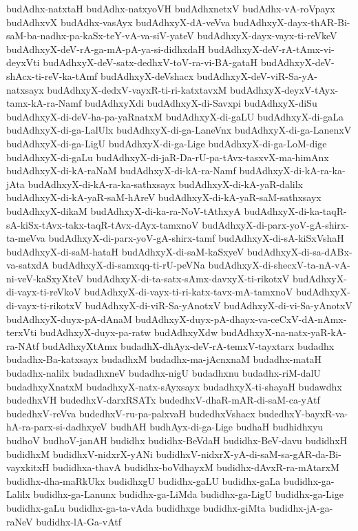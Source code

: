 {budAdhx-natxtaH
budAdhx-natxyoVH
budAdhxnetxV
budAdhx-vA-roVpayx
budAdhxvX
budAdhx-vasAyx
budAdhxyX-dA-veVva
budAdhxyX-dayx-thAR-Bi-saM-ba-nadhx-pa-kaSx-teY-vA-va-siV-yateV
budAdhxyX-dayx-vayx-ti-reVkeV
budAdhxyX-deV-rA-ga-mA-pA-ya-si-didhxdaH
budAdhxyX-deV-rA-tAmx-vi-deyxVti
budAdhxyX-deV-satx-dedhxV-toV-ra-vi-BA-gataH
budAdhxyX-deV-shAcx-ti-reV-ka-tAmf
budAdhxyX-deVshacx
budAdhxyX-deV-viR-Sa-yA-natxsayx
budAdhxyX-dedxV-vayxR-ti-ri-katxtavxM
budAdhxyX-deyxV-tAyx-tamx-kA-ra-Namf
budAdhxyXdi
budAdhxyX-di-Savxpi
budAdhxyX-diSu
budAdhxyX-di-deV-ha-pa-yaRnatxM
budAdhxyX-di-gaLU
budAdhxyX-di-gaLa
budAdhxyX-di-ga-LalUlx
budAdhxyX-di-ga-LaneVnx
budAdhxyX-di-ga-LanenxV
budAdhxyX-di-ga-LigU
budAdhxyX-di-ga-Lige
budAdhxyX-di-ga-LoM-dige
budAdhxyX-di-gaLu
budAdhxyX-di-jaR-Da-rU-pa-tAvx-tasxvX-ma-himAnx
budAdhxyX-di-kA-raNaM
budAdhxyX-di-kA-ra-Namf
budAdhxyX-di-kA-ra-ka-jAta
budAdhxyX-di-kA-ra-ka-sathxsayx
budAdhxyX-di-kA-yaR-dalilx
budAdhxyX-di-kA-yaR-saM-hAreV
budAdhxyX-di-kA-yaR-saM-sathxsayx
budAdhxyX-dikaM
budAdhxyX-di-ka-ra-NoV-tAthxyA
budAdhxyX-di-ka-taqR-sA-kiSx-tAvx-takx-taqR-tAvx-dAyx-tamxnoV
budAdhxyX-di-parx-yoV-gA-shirx-ta-meVva
budAdhxyX-di-parx-yoV-gA-shirx-tamf
budAdhxyX-di-sA-kiSxVshaH
budAdhxyX-di-saM-hataH
budAdhxyX-di-saM-kaSxyeV
budAdhxyX-di-sa-dABx-va-satxdA
budAdhxyX-di-samxqq-ti-rU-peVNa
budAdhxyX-di-shecxV-ta-nA-vA-ni-veV-kaSxyXteV
budAdhxyX-di-ta-satx-sAmx-davxyX-ti-rikotxV
budAdhxyX-di-vayx-ti-reVkoV
budAdhxyX-di-vayx-ti-ri-katx-tavx-mA-tamxnoV
budAdhxyX-di-vayx-ti-rikotxV
budAdhxyX-di-viR-Sa-yAnotxV
budAdhxyX-di-vi-Sa-yAnotxV
budAdhxyX-duyx-pA-dAnaM
budAdhxyX-duyx-pA-dhayx-va-ceCxV-dA-nAmx-terxVti
budAdhxyX-duyx-pa-ratw
budAdhxyXdw
budAdhxyX-na-natx-yaR-kA-ra-NAtf
budAdhxyXtAmx
budadhX-dhAyx-deV-rA-temxV-tayxtarx
budadhx
budadhx-Ba-katxsayx
budadhxM
budadhx-ma-jAcnxnaM
budadhx-mataH
budadhx-nalilx
budadhxneV
budadhx-nigU
budadhxnu
budadhx-riM-dalU
budadhxyXnatxM
budadhxyX-natx-sAyxsayx
budadhxyX-ti-shayaH
budawdhx
budedhxVH
budedhxV-darxRSATx
budedhxV-dhaR-mAR-di-saM-ca-yAtf
budedhxV-reVva
budedhxV-ru-pa-palxvaH
budedhxVshacx
budedhxY-bayxR-va-hA-ra-parx-si-dadhxyeV
budhAH
budhAyx-di-ga-Lige
budhaH
budhidhxyu
budhoV
budhoV-janAH
budidhx
budidhx-BeVdaH
budidhx-BeV-davu
budidhxH
budidhxM
budidhxV-nidxrX-yANi
budidhxV-nidxrX-yA-di-saM-sa-gAR-da-Bi-vayxkitxH
budidhxa-thavA
budidhx-boVdhayxM
budidhx-dAvxR-ra-mAtarxM
budidhx-dha-maRkUkx
budidhxgU
budidhx-gaLU
budidhx-gaLa
budidhx-ga-Lalilx
budidhx-ga-Lanunx
budidhx-ga-LiMda
budidhx-ga-LigU
budidhx-ga-Lige
budidhx-gaLu
budidhx-ga-ta-vAda
budidhxge
budidhx-giMta
budidhx-jA-ga-raNeV
budidhx-lA-Ga-vAtf
}
